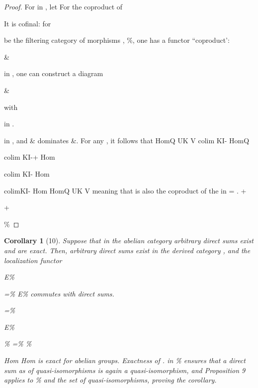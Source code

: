 \documentclass[11pt,a4paper]{article}
\theoremstyle{plain}
\newtheorem{corollary}[theorem]{Corollary}
\theoremstyle{definition}
\begin{document}
\begin{proof} For in , let
For the coproduct of



It is cofinal: for

 be the filtering category of morphisms  
 ,   \%, one has a functor ``coproduct':



\& 

  

 in  , one can construct a diagram
  




\& 

with 

 in  .




   
 in  , and \& dominates \&. For any  , it follows that
HomQ UK V    colim KI- HomQ     



colim KI-+ Hom

     colim KI- Hom   


colimKI- Hom   
HomQ UK V    
meaning that  is also the coproduct of the  in =  .
+

+

\%



\end{proof}

\begin{corollary}[10]
Suppose that in the abelian category arbitrary direct sums exist
and are exact. Then, arbitrary direct sums exist in the derived category
, and
the localization functor

E\%

=\% E\%
commutes with direct sums.

=\%

E\%

\%
=\%
\%
   
  

 
 Hom   
 Hom    
 is exact for abelian groups. Exactness of . in \% ensures that a direct sum
as
of quasi-isomorphisms is again a quasi-isomorphism, and Proposition 9 applies to
\% and the set  of quasi-isomorphisms, proving the corollary.


\end{corollary}
\end{document}
